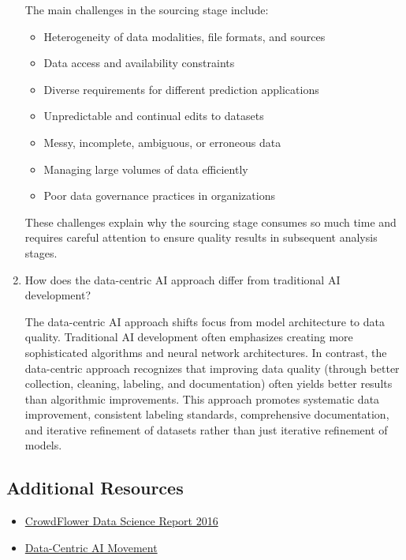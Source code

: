 \documentclass[12pt]{article}
\begin{document}
\begin{enumerate}
    \begin{tcolorbox}[colback=blue!5!white,colframe=blue!75!black,title={Solution}]
    The main challenges in the sourcing stage include:
    \begin{itemize}
        \item Heterogeneity of data modalities, file formats, and sources
        \item Data access and availability constraints
        \item Diverse requirements for different prediction applications
        \item Unpredictable and continual edits to datasets
        \item Messy, incomplete, ambiguous, or erroneous data
        \item Managing large volumes of data efficiently
        \item Poor data governance practices in organizations
    \end{itemize}
    These challenges explain why the sourcing stage consumes so much time and requires careful attention to ensure quality results in subsequent analysis stages.
    \end{tcolorbox}
    
    \item How does the data-centric AI approach differ from traditional AI development?
    
    \begin{tcolorbox}[colback=blue!5!white,colframe=blue!75!black,title={Solution}]
    The data-centric AI approach shifts focus from model architecture to data quality. Traditional AI development often emphasizes creating more sophisticated algorithms and neural network architectures. In contrast, the data-centric approach recognizes that improving data quality (through better collection, cleaning, labeling, and documentation) often yields better results than algorithmic improvements. This approach promotes systematic data improvement, consistent labeling standards, comprehensive documentation, and iterative refinement of datasets rather than just iterative refinement of models.
    \end{tcolorbox}
\end{enumerate}

\subsection{Additional Resources}

\begin{itemize}
    \item \href{https://visit.figure-eight.com/rs/416-ZBE-142/images/CrowdFlower_DataScienceReport_2016.pdf}{CrowdFlower Data Science Report 2016}
    \item \href{https://datacentricai.org/}{Data-Centric AI Movement}
\end{itemize}
\end{document}

